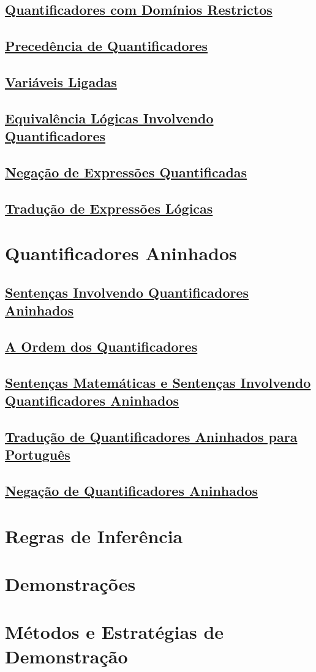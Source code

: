  \subsection*{\underline{Quantificadores com Domínios
Restrictos}} \subsection*{\underline{Precedência de Quantificadores}}
\subsection*{\underline{Variáveis Ligadas}}
\subsection*{\underline{Equivalência Lógicas Involvendo Quantificadores}}
\subsection*{\underline{Negação de Expressões Quantificadas}}
\subsection*{\underline{Tradução de Expressões Lógicas}}

\section{Quantificadores Aninhados}

\subsection*{\underline{Sentenças Involvendo Quantificadores Aninhados}}
\subsection*{\underline{A Ordem dos Quantificadores}}
\subsection*{\underline{Sentenças Matemáticas e Sentenças Involvendo Quantificadores
Aninhados}}
\subsection*{\underline{Tradução de Quantificadores Aninhados para Português}}
\subsection*{\underline{Negação de Quantificadores Aninhados}}

\section{Regras de Inferência}
\section{Demonstrações}
\section{Métodos e Estratégias de Demonstração}